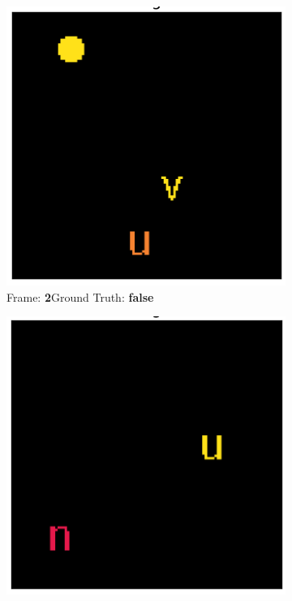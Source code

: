 \begin{figure}[htbp]
\begin{subfigure}{0.25\textwidth}
		\includegraphics[width=0.9\linewidth]{"../img/visualization/experiment_run_20190917_022319/Frame 2"}
		\caption{Frame: \textbf{2}\newline Ground Truth: \textbf{false}}
		\label{fig:frame-2}
	\end{subfigure}%
	\hfill
	\begin{subfigure}{0.25\textwidth}
		\centering
		\includegraphics[width=0.9\linewidth]{"../img/visualization/experiment_run_20190917_022319/Frame 3"}

\end{subfigure}
\end{figure}
